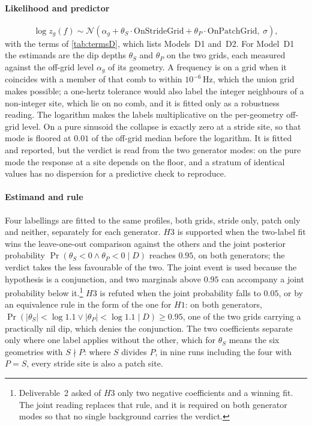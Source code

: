 \paragraph{Likelihood and predictor}
\begin{equation*}
\log z_g(f) \sim \mathcal{N}\!\left(
\alpha_g + \theta_S \cdot \text{OnStrideGrid} + \theta_P \cdot \text{OnPatchGrid},\ \sigma
\right),
\end{equation*}
with the terms of \autoref{tab:termsD}, which lists Models~D1 and~D2. For Model~D1 the estimands are the dip depths $\theta_S$ and $\theta_P$ on the two grids, each measured against the off-grid level $\alpha_g$ of its geometry. A frequency is on a grid when it coincides with a member of that comb to within $10^{-6}$\,Hz, which the union grid makes possible; a one-hertz tolerance would also label the integer neighbours of a non-integer site, which lie on no comb, and it is fitted only as a robustness reading. The logarithm makes the labels multiplicative on the per-geometry off-grid level. On a pure sinusoid the collapse is exactly zero at a stride site, so that mode is floored at $0.01$ of the off-grid median before the logarithm. It is fitted and reported, but the verdict is read from the two generator modes: on the pure mode the response at a site depends on the floor, and a stratum of identical values has no dispersion for a predictive check to reproduce.

\paragraph{Estimand and rule} Four labellings are fitted to the same profiles, both grids, stride only, patch only and neither, separately for each generator. $H3$ is supported when the two-label fit wins the leave-one-out comparison against the others and the joint posterior probability $\Pr(\theta_S<0\wedge\theta_P<0\mid D)$ reaches $0.95$, on both generators; the verdict takes the less favourable of the two. The joint event is used because the hypothesis is a conjunction, and two marginals above $0.95$ can accompany a joint probability below it.\footnote{Deliverable~2 asked of $H3$ only two negative coefficients and a winning fit. The joint reading replaces that rule, and it is required on both generator modes so that no single background carries the verdict.} $H3$ is refuted when the joint probability falls to $0.05$, or by an equivalence rule in the form of the one for $H1$: on both generators, $\Pr(|\theta_S|<\log1.1\lor|\theta_P|<\log1.1\mid D)\ge0.95$, one of the two grids carrying a practically nil dip, which denies the conjunction. The two coefficients separate only where one label applies without the other, which for $\theta_S$ means the six geometries with $S\nmid P$: where $S$ divides $P$, in nine runs including the four with $P=S$, every stride site is also a patch site.

